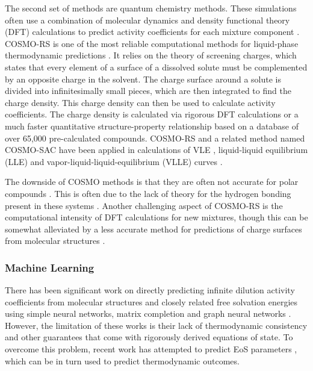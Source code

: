 The second set of methods are quantum chemistry methods. These simulations often use a combination of molecular dynamics and density functional theory (DFT) calculations to predict activity coefficients for each mixture component \cite{Constantinescu2005}. COSMO-RS is one of the most reliable computational methods for liquid-phase thermodynamic predictions \cite{Klamt1995, Klamt2010}. It relies on the theory of screening charges, which states that every element of a surface of a dissolved solute must be complemented by an opposite charge in the solvent. The charge surface around a solute is divided into infinitesimally small pieces, which are then integrated to find the charge density. This charge density can then be used to calculate activity coefficients. The charge density is calculated via rigorous DFT calculations or a much faster quantitative structure-property relationship based on a database of over 65,000 pre-calculated compounds. COSMO-RS and a related method named COSMO-SAC have been applied in calculations of VLE \cite{Constantinescu2005}, liquid-liquid equilibrium (LLE) \cite{Dechambre2014} and vapor-liquid-liquid-equilibrium (VLLE) curves \cite{Kundu2011}.

The downside of COSMO methods is that they are often not accurate for polar compounds \cite{Constantinescu2005, Kundu2011}. This is often due to the lack of theory for the hydrogen bonding present in these systems \cite{Kundu2011}. Another challenging aspect of COSMO-RS is the computational intensity of DFT calculations for new mixtures, though this can be somewhat alleviated by a less accurate method for predictions of charge surfaces from molecular structures \cite{Loschen2012}. 

\subsubsection{Machine Learning}

There has been significant work on directly predicting infinite dilution activity coefficients from molecular structures and closely related free solvation energies using simple neural networks\cite{Urata2002, RamirezBeltran2009, Nami2011, Behrooz2017}, matrix completion\cite{Jirasek2020} and  graph neural networks \cite{Vermeire2021, Felton2022, SanchezMedina2022, Qin2022, Rittig2022}. However, the limitation of these works is their lack of thermodynamic consistency and other guarantees that come with rigorously derived equations of state. To overcome this problem, recent work has attempted to predict EoS parameters \cite{Abbasi2020, Madani2021, Abdallahelhadj2022, Winter2022}, which can be in turn used to predict thermodynamic outcomes.

